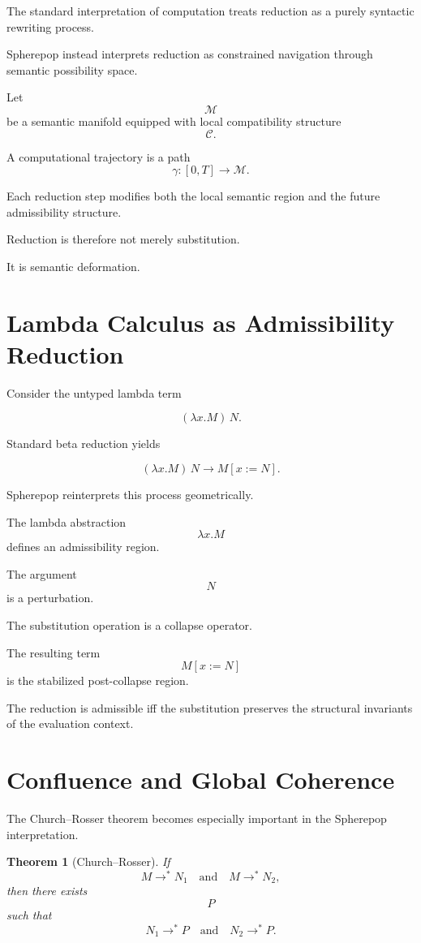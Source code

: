 \documentclass[12pt,openany]{book}
\theoremstyle{plain}
\newtheorem{theorem}{Theorem}[chapter]
\theoremstyle{definition}
\theoremstyle{remark}
\begin{document}
The standard interpretation of computation treats reduction as a
purely syntactic rewriting process.

Spherepop instead interprets reduction as constrained navigation
through semantic possibility space.

Let
\[
\mathcal{M}
\]
be a semantic manifold equipped with local compatibility
structure
\[
\mathcal{C}.
\]

A computational trajectory is a path
\[
\gamma : [0,T]\to\mathcal{M}.
\]

Each reduction step modifies both the local semantic region and
the future admissibility structure.

Reduction is therefore not merely substitution.

It is semantic deformation.

\section{Lambda Calculus as Admissibility Reduction}

Consider the untyped lambda term

\[
(\lambda x.M)\,N.
\]

Standard beta reduction yields

\[
(\lambda x.M)\,N
\to
M[x:=N].
\]

Spherepop reinterprets this process geometrically.

The lambda abstraction
\[
\lambda x.M
\]
defines an admissibility region.

The argument
\[
N
\]
is a perturbation.

The substitution operation is a collapse operator.

The resulting term
\[
M[x:=N]
\]
is the stabilized post-collapse region.

The reduction is admissible iff the substitution preserves the
structural invariants of the evaluation context.

\section{Confluence and Global Coherence}

The Church--Rosser theorem becomes especially important in the
Spherepop interpretation.

\begin{theorem}[Church--Rosser]
If
\[
M \to^\ast N_1
\quad\text{and}\quad
M \to^\ast N_2,
\]
then there exists
\[
P
\]
such that
\[
N_1 \to^\ast P
\quad\text{and}\quad
N_2 \to^\ast P.
\]
\end{theorem}
\end{document}
